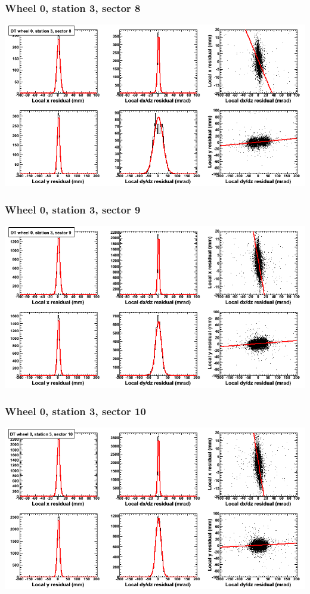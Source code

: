 \documentclass[compress]{beamer}
\begin{document}
\begin{frame}
\frametitle{Wheel 0, station 3, sector 8}
\includegraphics[width=\linewidth]{tmpbell_MBwhCst3sec08.png}
\end{frame}

\begin{frame}
\frametitle{Wheel 0, station 3, sector 9}
\includegraphics[width=\linewidth]{tmpbell_MBwhCst3sec09.png}
\end{frame}

\begin{frame}
\frametitle{Wheel 0, station 3, sector 10}
\includegraphics[width=\linewidth]{tmpbell_MBwhCst3sec10.png}
\end{frame}
\end{document}
